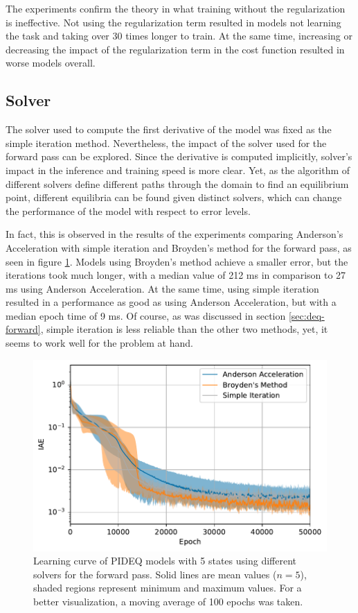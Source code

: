 The experiments confirm the theory in what training without the regularization is ineffective.
Not using the regularization term resulted in models not learning the task and taking over 30 times longer to train.
At the same time, increasing or decreasing the impact of the regularization term in the cost function resulted in worse models overall.

\subsection{Solver}

The solver used to compute the first derivative of the model was fixed as the simple iteration method.
Nevertheless, the impact of the solver used for the forward pass can be explored.
Since the derivative is computed implicitly, solver's impact in the inference and training speed is more clear.
Yet, as the algorithm of different solvers define different paths through the domain to find an equilibrium point, different equilibria can be found given distinct solvers, which can change the performance of the model with respect to error levels. 

In fact, this is observed in the results of the experiments comparing Anderson's Acceleration with simple iteration and Broyden's method\cite{broyden_class_1965} for the forward pass, as seen in figure \ref{fig:solver-iae}.
Models using Broyden's method achieve a smaller error, but the iterations took much longer, with a median value of 212 ms in comparison to 27 ms using Anderson Acceleration.
At the same time, using simple iteration resulted in a performance as good as using Anderson Acceleration, but with a median epoch time of 9 ms.
Of course, as was discussed in section \ref{sec:deq-forward}, simple iteration is less reliable than the other two methods, yet, it seems to work well for the problem at hand.

\begin{figure}[h]
    \centering
    \includegraphics{images/exp_5_iae.pdf}
    \caption{Learning curve of \gls{PIDEQ} models with 5 states using different solvers for the forward pass. Solid lines are mean values ($n=5$), shaded regions represent minimum and maximum values. For a better visualization, a moving average of 100 epochs was taken.}
    \label{fig:solver-iae}
\end{figure}

